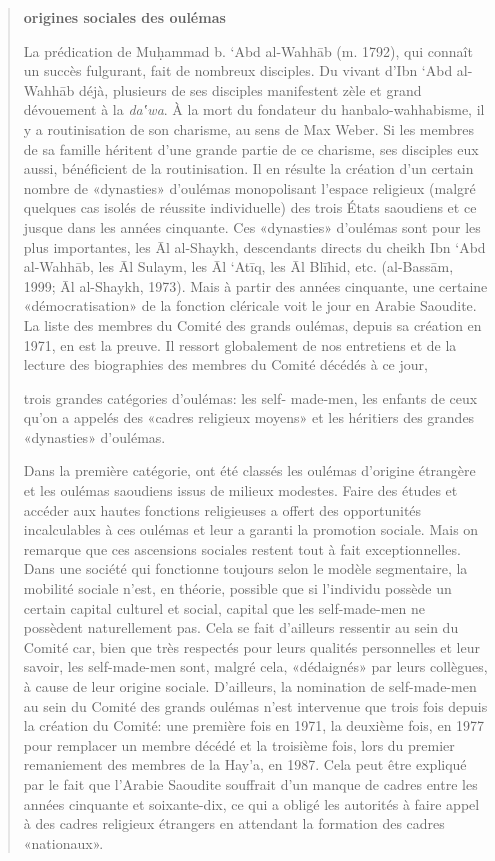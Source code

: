 \begin{quote}
\textbf{origines sociales des oulémas}

La prédication de Muḥammad b. `Abd al-Wahhāb (m. 1792), qui connaît un
succès fulgurant, fait de nombreux disciples. Du vivant d'Ibn `Abd
al-Wahhāb déjà, plusieurs de ses disciples manifestent zèle et grand
dévouement à la \emph{da‛wa}. À la mort du fondateur du
hanbalo-wahhabisme, il y a routinisation de son charisme, au sens de Max
Weber. Si les membres de sa famille héritent d'une grande partie de ce
charisme, ses disciples eux aussi, bénéficient de la routinisation. Il
en résulte la création d'un certain nombre de «dynasties» d'oulémas
monopolisant l'espace religieux (malgré quelques cas isolés de réussite
individuelle) des trois États saoudiens et ce jusque dans les années
cinquante. Ces «dynasties» d'oulémas sont pour les plus importantes, les
Āl al-Shaykh, descendants directs du cheikh Ibn `Abd al-Wahhāb, les Āl
Sulaym, les Āl `Atīq, les Āl Blīhid, etc. (al-Bassām, 1999; Āl
al-Shaykh, 1973). Mais à partir des années cinquante, une certaine
«démocratisation» de la fonction cléricale voit le jour en Arabie
Saoudite. La liste des membres du Comité des grands oulémas, depuis sa
création en 1971, en est la preuve. Il ressort globalement de nos
entretiens et de la lecture des biographies des membres du Comité
décédés à ce jour, 
\begin{Synthesis}
trois grandes catégories d'oulémas: les self-
made-men, les enfants de ceux qu'on a appelés des «cadres religieux
moyens» et les héritiers des grandes «dynasties» d'oulémas.
\end{Synthesis}

Dans la première catégorie, ont été classés les oulémas d'origine
étrangère et les oulémas saoudiens issus de milieux modestes. Faire des
études et accéder aux hautes fonctions religieuses a offert des
opportunités incalculables à ces oulémas et leur a garanti la promotion
sociale. Mais on remarque que ces ascensions sociales restent tout à
fait exceptionnelles. Dans une société qui fonctionne toujours selon le
modèle segmentaire, la mobilité sociale n'est, en théorie, possible que
si l'individu possède un certain capital culturel et social, capital que
les self-made-men ne possèdent naturellement pas. Cela se fait
d'ailleurs ressentir au sein du Comité car, bien que très respectés pour
leurs qualités personnelles et leur savoir, les self-made-men sont,
malgré cela, «dédaignés» par leurs collègues, à cause de leur origine
sociale. D'ailleurs, la nomination de self-made-men au sein du Comité
des grands oulémas n'est intervenue que trois fois depuis la création du
Comité: une première fois en 1971, la deuxième fois, en 1977 pour
remplacer un membre décédé et la troisième fois, lors du premier
remaniement des membres de la Hay'a, en 1987. Cela peut être expliqué
par le fait que l'Arabie Saoudite souffrait d'un manque de cadres entre
les années cinquante et soixante-dix, ce qui a obligé les autorités à
faire appel à des cadres religieux étrangers en attendant la formation
des cadres «nationaux».


\end{quote}
